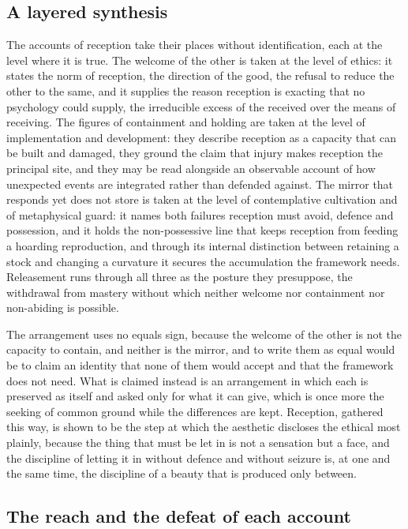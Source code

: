 \subsection{A layered synthesis}
\label{p22:sub:reception-synthesis}

The accounts of reception take their places without identification, each at the level where it is true. The welcome of the other is taken at the level of ethics: it states the norm of reception, the direction of the good, the refusal to reduce the other to the same, and it supplies the reason reception is exacting that no psychology could supply, the irreducible excess of the received over the means of receiving. The figures of containment and holding are taken at the level of implementation and development: they describe reception as a capacity that can be built and damaged, they ground the claim that injury makes reception the principal site, and they may be read alongside an observable account of how unexpected events are integrated rather than defended against. The mirror that responds yet does not store is taken at the level of contemplative cultivation and of metaphysical guard: it names both failures reception must avoid, defence and possession, and it holds the non-possessive line that keeps reception from feeding a hoarding reproduction, and through its internal distinction between retaining a stock and changing a curvature it secures the accumulation the framework needs. Releasement runs through all three as the posture they presuppose, the withdrawal from mastery without which neither welcome nor containment nor non-abiding is possible.

The arrangement uses no equals sign, because the welcome of the other is not the capacity to contain, and neither is the mirror, and to write them as equal would be to claim an identity that none of them would accept and that the framework does not need. What is claimed instead is an arrangement in which each is preserved as itself and asked only for what it can give, which is once more the seeking of common ground while the differences are kept. Reception, gathered this way, is shown to be the step at which the aesthetic discloses the ethical most plainly, because the thing that must be let in is not a sensation but a face, and the discipline of letting it in without defence and without seizure is, at one and the same time, the discipline of a beauty that is produced only between.

\subsection{The reach and the defeat of each account}
\label{p22:sub:reception-ledger}

